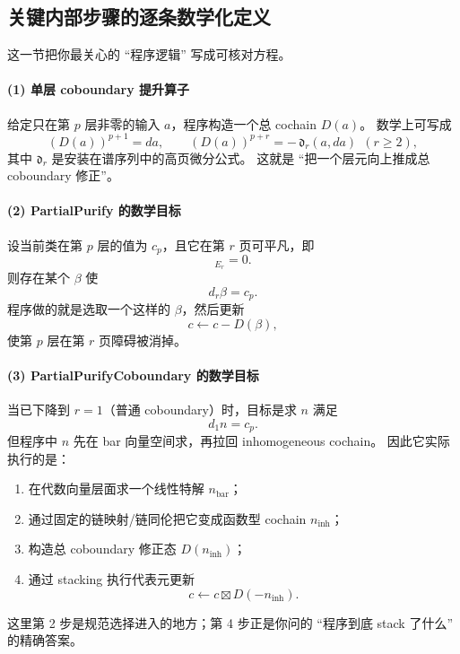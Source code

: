 \documentclass[a4paper,fontset=ubuntu,12pt]{ctexart}
\begin{document}
\subsection{关键内部步骤的逐条数学化定义}

这一节把你最关心的 ``程序逻辑'' 写成可核对方程。

\paragraph{(1) 单层 coboundary 提升算子}
给定只在第 $p$ 层非零的输入 $a$，程序构造一个总 cochain $D(a)$。
数学上可写成
\begin{equation}
(D(a))^{p+1}=d a,\qquad
(D(a))^{p+r}=-\,\mathfrak{d}_r(a,da)\ \ (r\ge 2),
\label{eq:D-a}
\end{equation}
其中 $\mathfrak{d}_r$ 是安装在谱序列中的高页微分公式。
这就是 ``把一个层元向上推成总 coboundary 修正''。

\paragraph{(2) PartialPurify 的数学目标}
设当前类在第 $p$ 层的值为 $c_p$，且它在第 $r$ 页可平凡，即
\begin{equation}
[c_p]_{E_r}=0.
\label{eq:cp-trivial-er}
\end{equation}
则存在某个 $\beta$ 使
\begin{equation}
d_r\beta=c_p.
\label{eq:dr-beta}
\end{equation}
程序做的就是选取一个这样的 $\beta$，然后更新
\begin{equation}
c\leftarrow c-D(\beta),
\label{eq:partial-purify-update}
\end{equation}
使第 $p$ 层在第 $r$ 页障碍被消掉。

\paragraph{(3) PartialPurifyCoboundary 的数学目标}
当已下降到 $r=1$（普通 coboundary）时，目标是求 $n$ 满足
\begin{equation}
d_1 n = c_p.
\label{eq:d1n-cp}
\end{equation}
但程序中 $n$ 先在 bar 向量空间求，再拉回 inhomogeneous cochain。
因此它实际执行的是：
\begin{enumerate}
\item 在代数向量层面求一个线性特解 $n_{\mathrm{bar}}$；
\item 通过固定的链映射/链同伦把它变成函数型 cochain $n_{\mathrm{inh}}$；
\item 构造总 coboundary 修正态 $D(n_{\mathrm{inh}})$；
\item 通过 stacking 执行代表元更新
\begin{equation}
c\leftarrow c\boxtimes D(-n_{\mathrm{inh}}).
\label{eq:purify-stack-update}
\end{equation}
\end{enumerate}
这里第 2 步是规范选择进入的地方；第 4 步正是你问的 ``程序到底 stack 了什么'' 的精确答案。
\end{document}
